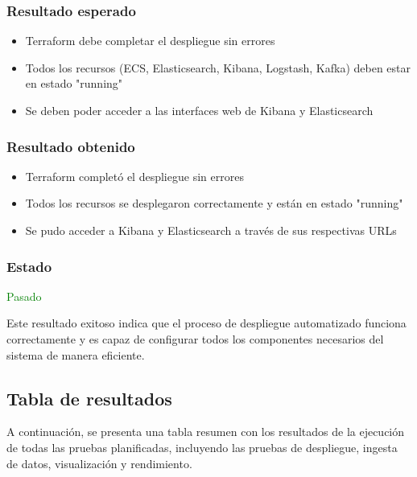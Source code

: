 \subsubsection{Resultado esperado}
\begin{itemize}
    \item Terraform debe completar el despliegue sin errores
    \item Todos los recursos (ECS, Elasticsearch, Kibana, Logstash, Kafka)
    deben estar en estado "running"
    \item Se deben poder acceder a las interfaces web de Kibana y Elasticsearch
\end{itemize}

\subsubsection{Resultado obtenido}
\begin{itemize}
    \item Terraform completó el despliegue sin errores
    \item Todos los recursos se desplegaron correctamente y están en estado
    "running"
    \item Se pudo acceder a Kibana y Elasticsearch a través de sus respectivas
    URLs
\end{itemize}

\subsubsection{Estado} \textcolor{green}{Pasado}

Este resultado exitoso indica que el proceso de despliegue automatizado
funciona correctamente y es capaz de configurar todos los componentes
necesarios del sistema de manera eficiente.


\newpage{}
\subsection{Tabla de resultados}
A continuación, se presenta una tabla resumen con los resultados de la
ejecución de todas las pruebas planificadas, incluyendo las pruebas de
despliegue, ingesta de datos, visualización y rendimiento.

